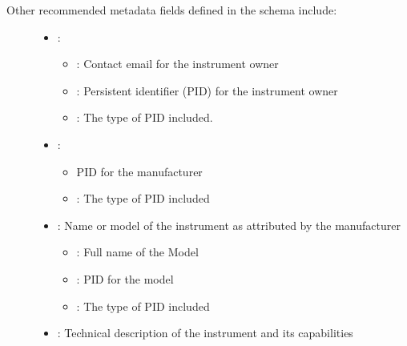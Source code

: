 \documentclass[letterpaper,10pt,english]{sphinxmanual}
\begin{document}
\begin{description}
\item[{Other recommended metadata fields defined in the schema include:}] \leavevmode\begin{itemize}
\item {} 
\sphinxAtStartPar
{}:
\begin{itemize}
\item {} 
\sphinxAtStartPar
{}: Contact email for the instrument owner

\item {} 
\sphinxAtStartPar
{}: Persistent identifier (PID) for the instrument owner

\item {} 
\sphinxAtStartPar
{}: The type of PID included.

\end{itemize}

\item {} 
\sphinxAtStartPar
{}:
\begin{itemize}
\item {} 
\sphinxAtStartPar
{} PID for the manufacturer

\item {} 
\sphinxAtStartPar
{}: The type of PID included

\end{itemize}

\item {} 
\sphinxAtStartPar
{}: Name or model of the instrument as attributed by the manufacturer
\begin{itemize}
\item {} 
\sphinxAtStartPar
{}: Full name of the Model

\item {} 
\sphinxAtStartPar
{}: PID for the model

\item {} 
\sphinxAtStartPar
{}: The type of PID included

\end{itemize}

\item {} 
\sphinxAtStartPar
{}: Technical description of the instrument and its capabilities


\end{itemize}
\end{description}
\end{document}
